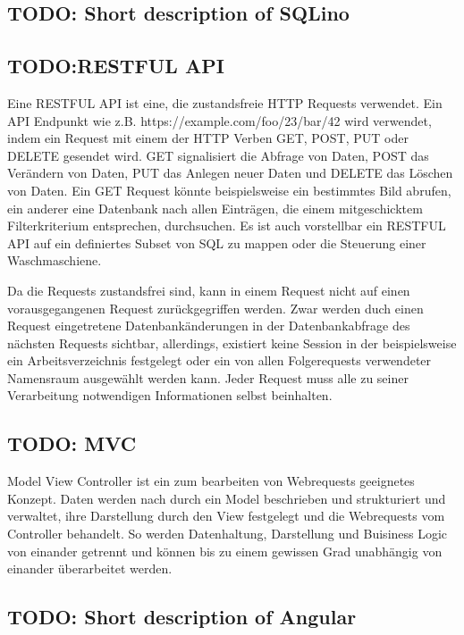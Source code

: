 \subsection{TODO: Short description of SQLino}

\subsection{TODO:RESTFUL API} Eine RESTFUL API ist eine, die
zustandsfreie HTTP Requests verwendet. Ein API
Endpunkt wie
z.B. https://example.com/foo/23/bar/42 wird verwendet, indem ein
Request mit einem der HTTP Verben GET, POST, PUT oder DELETE gesendet
wird.  GET signalisiert die Abfrage von Daten, POST das Verändern von
Daten, PUT das Anlegen neuer Daten und DELETE das Löschen von
Daten. Ein GET Request könnte beispielsweise ein bestimmtes Bild
abrufen, ein anderer eine Datenbank nach allen Einträgen, die einem
mitgeschicktem Filterkriterium entsprechen, durchsuchen. Es ist auch
vorstellbar ein RESTFUL API auf ein definiertes Subset von SQL zu
mappen oder die Steuerung einer Waschmaschiene.

Da die Requests zustandsfrei sind, kann in einem Request nicht auf
einen vorausgegangenen Request zurückgegriffen werden. Zwar werden
duch einen Request eingetretene Datenbankänderungen in der
Datenbankabfrage des nächsten Requests sichtbar, allerdings, existiert
keine Session in der beispielsweise ein Arbeitsverzeichnis festgelegt
oder ein von allen Folgerequests verwendeter Namensraum ausgewählt
werden kann. Jeder Request muss alle zu seiner Verarbeitung
notwendigen Informationen selbst beinhalten.

\subsection{TODO: MVC} Model View Controller ist ein zum bearbeiten
von Webrequests geeignetes Konzept.  Daten werden nach durch ein Model
beschrieben und strukturiert und verwaltet, ihre Darstellung durch den
View festgelegt und die Webrequests vom Controller behandelt. So
werden Datenhaltung, Darstellung und Buisiness Logic von einander
getrennt und können bis zu einem gewissen Grad unabhängig von einander
überarbeitet werden.

\subsection{TODO: Short description of Angular}

